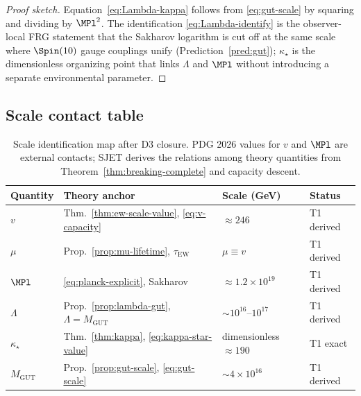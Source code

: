 \begin{proof}[Proof sketch]
Equation~\eqref{eq:Lambda-kappa} follows from \eqref{eq:gut-scale} by
squaring and dividing by $\MPl^2$. The identification
\eqref{eq:Lambda-identify} is the observer-local FRG statement that the
Sakharov logarithm is cut off at the same scale where $\Spin(10)$ gauge
couplings unify (Prediction~\ref{pred:gut}); $\kappa_\star$ is the
dimensionless organizing point that links $\Lambda$ and $\MPl$ without
introducing a separate environmental parameter.
\end{proof}

\subsection{Scale contact table}
\label{sec:scales:table}

\begin{table}[ht]
\centering
\small
\renewcommand{\arraystretch}{1.12}
\begin{tabular}{@{}llll@{}}
\toprule
\textbf{Quantity} & \textbf{Theory anchor} & \textbf{Scale (GeV)} &
\textbf{Status} \\
\midrule
$v$ &
  Thm.~\ref{thm:ew-scale-value}, \eqref{eq:v-capacity} &
  $\approx 246$ &
  T1 derived \\
$\mu$ &
  Prop.~\ref{prop:mu-lifetime}, $\tau_{\mathrm{EW}}$ &
  $\mu\equiv v$ &
  T1 derived \\
$\MPl$ &
  \eqref{eq:planck-explicit}, Sakharov &
  $\approx 1.2\times 10^{19}$ &
  T1 derived \\
$\Lambda$ &
  Prop.~\ref{prop:lambda-gut}, $\Lambda=M_{\mathrm{GUT}}$ &
  $\sim 10^{16}$--$10^{17}$ &
  T1 derived \\
$\kappa_\star$ &
  Thm.~\ref{thm:kappa}, \eqref{eq:kappa-star-value} &
  dimensionless $\approx 190$ &
  T1 exact \\
$M_{\mathrm{GUT}}$ &
  Prop.~\ref{prop:gut-scale}, \eqref{eq:gut-scale} &
  $\sim 4\times 10^{16}$ &
  T1 derived \\
\bottomrule
\end{tabular}
\caption{Scale identification map after D3 closure. PDG 2026 values for $v$ and
$\MPl$ are external contacts; SJET derives the relations among theory
quantities from Theorem~\ref{thm:breaking-complete} and capacity descent.}
\label{tab:scale-map}
\end{table}

